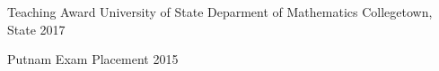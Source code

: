 


\begin{cvhonors}

  \cvhonor
    {Teaching Award} %
    {University of State Deparment of Mathematics} %
    {Collegetown, State} %
    {2017} %
\end{cvhonors}




\begin{cvhonors}

  \cvhonor
    {Putnam Exam} %
    {Placement} %
    {} %
    {2015} %

\end{cvhonors}
